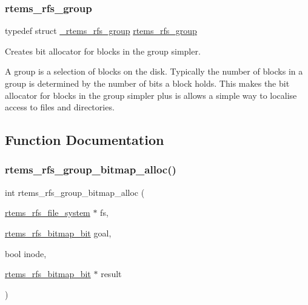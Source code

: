 \subsubsection{\texorpdfstring{rtems\_rfs\_group}{rtems\_rfs\_group}}
{\footnotesize\ttfamily typedef struct \mbox{\hyperlink{struct__rtems__rfs__group}{\+\_\+rtems\+\_\+rfs\+\_\+group}}  \mbox{\hyperlink{group__rtems__rfs_ga0e7b27c60e21039ef07a8c843fa8a3e5}{rtems\+\_\+rfs\+\_\+group}}}



Creates bit allocator for blocks in the group simpler. 

A group is a selection of blocks on the disk. Typically the number of blocks in a group is determined by the number of bits a block holds. This makes the bit allocator for blocks in the group simpler plus is allows a simple way to localise access to files and directories. 

\subsection{Function Documentation}
\mbox{\label{group__rtems__rfs_ga41c38f1d939cf04cad27dde05f52c394}} 
\subsubsection{\texorpdfstring{rtems\_rfs\_group\_bitmap\_alloc()}{rtems\_rfs\_group\_bitmap\_alloc()}}
{\footnotesize\ttfamily int rtems\+\_\+rfs\+\_\+group\+\_\+bitmap\+\_\+alloc (\begin{DoxyParamCaption}\item[{\mbox{\hyperlink{struct__rtems__rfs__file__system}{rtems\+\_\+rfs\+\_\+file\+\_\+system}} $\ast$}]{fs,  }\item[{\mbox{\hyperlink{rtems-rfs-bitmaps_8h_acc1b0aefe1b090890ccbc1b05279a78e}{rtems\+\_\+rfs\+\_\+bitmap\+\_\+bit}}}]{goal,  }\item[{bool}]{inode,  }\item[{\mbox{\hyperlink{rtems-rfs-bitmaps_8h_acc1b0aefe1b090890ccbc1b05279a78e}{rtems\+\_\+rfs\+\_\+bitmap\+\_\+bit}} $\ast$}]{result }\end{DoxyParamCaption})}



